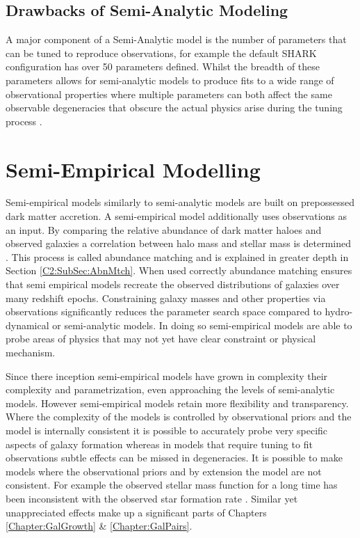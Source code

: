 \subsection{Drawbacks of Semi-Analytic Modeling}
A major component of a Semi-Analytic model is the number of parameters that can be tuned to reproduce observations, for example the default SHARK configuration has over 50 parameters defined. Whilst the breadth of these parameters allows for semi-analytic models to produce fits to a wide range of observational properties where multiple parameters can both affect the same observable degeneracies that obscure the actual physics arise during the tuning process \citep{Lapi2011DarkModels,Gonzalez2011Evolution4}.


\section{Semi-Empirical Modelling}
\label{sec:SEM}
Semi-empirical models similarly to semi-analytic models are built on prepossessed dark matter accretion. A semi-empirical model additionally uses observations as an input. By comparing the relative abundance of dark matter haloes and observed galaxies a correlation between halo mass and stellar mass is determined \citep{Kravtsov2004TheDistribution,Shankar2006NewFormation}. This process is called abundance matching and is explained in greater depth in Section \ref{C2:SubSec:AbnMtch}. When used correctly abundance matching ensures that semi empirical models recreate the observed distributions of galaxies over many redshift epochs. Constraining galaxy masses and other properties via observations significantly reduces the parameter search space compared to hydro-dynamical or semi-analytic models. In doing so semi-empirical models are able to probe areas of physics that may not yet have clear constraint or physical mechanism.

Since there inception semi-empirical models have grown in complexity their complexity and parametrization, even approaching the levels of semi-analytic models. However semi-empirical models retain more flexibility and transparency. Where the complexity of the models is controlled by observational priors and the model is internally consistent it is possible to accurately probe very specific aspects of galaxy formation whereas in models that require tuning to fit observations subtle effects can be missed in degeneracies. It is possible to make models where the observational priors and by extension the model are not consistent. For example the observed stellar mass function for a long time has been inconsistent with the observed star formation rate \citep{Leja2015ReconcilingFunction,Lapi2017StellarEquation}. Similar yet unappreciated effects make up a significant parts of Chapters \ref{Chapter:GalGrowth} \& \ref{Chapter:GalPairs}.

